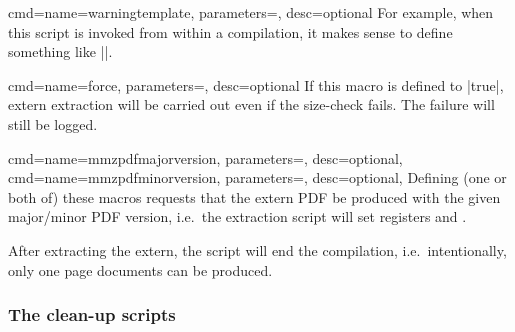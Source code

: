 \documentclass[a4paper,11pt]{article}
\begin{document}
\begin{doc}
\begin{doc}{cmd={name=warningtemplate, parameters=, desc=optional}}
    For example, when this script is invoked from within a 
    compilation, it makes sense to define something like
    |\def\warningtemplate{\PackageWarning{memoize}{\warningtext}}|.
  \end{doc}
  \begin{doc}{cmd={name=force,
        parameters=, desc=optional}}
    If this macro is defined to |true|, extern extraction will be carried out
    even if the size-check fails.  The failure will still be logged.
  \end{doc}
  \begin{doc}{
      cmd={name=mmzpdfmajorversion, parameters=, desc=optional},
      cmd={name=mmzpdfminorversion, parameters=, desc=optional},
    }
    Defining (one or both of) these macros requests that the extern PDF be
    produced with the given major\slash minor PDF version, i.e.\ the extraction
    script will set registers  and
    .
  \end{doc}
  
  After extracting the extern, the script will end the compilation, i.e.\
  intentionally, only one page documents can be produced.
\end{doc}

\subsubsection{The clean-up scripts}
\label{sec:cleanup-scripts}
\end{document}
